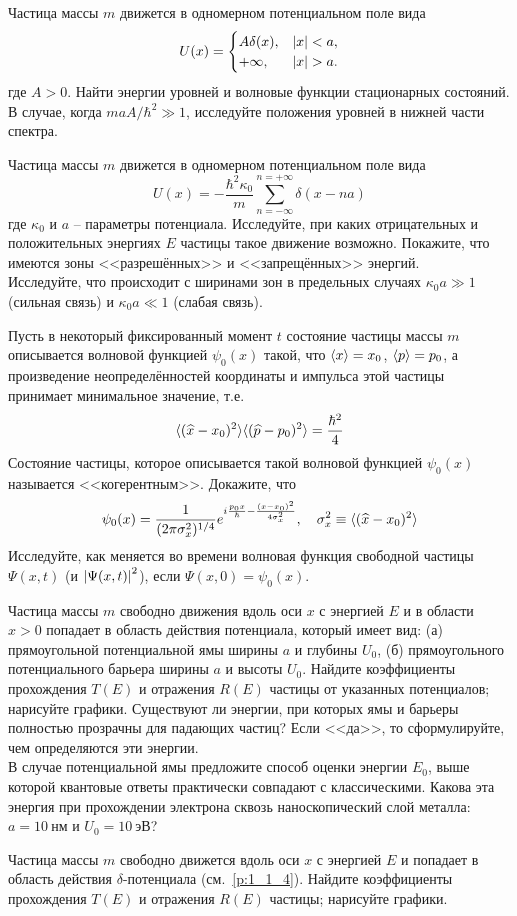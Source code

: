 \begin{problem}
%
\item\label{p:1_1_9}%
Частица массы $m$ движется в одномерном потенциальном поле вида
$$
U(x) =
\begin{cases}
A\delta(x), & \left\lvert{x}\right\rvert < a,\\
+\infty, & \left\lvert{x}\right\rvert > a.
\end{cases}
$$%
где $A > 0$. Найти энергии уровней и волновые функции стационарных состояний. В случае, когда $maA/\hbar^2 \gg 1$, исследуйте положения уровней в нижней части спектра.
%
\item\label{p:1_1_10}%
Частица массы $m$ движется в одномерном потенциальном поле вида
$$
U(x) = -\frac{\hbar^2 \kappa_0}{m} \sum_{n=-\infty}^{n=+\infty} \delta(x - na)
$$%
%
где $\kappa_0$ и $a$ -- параметры потенциала. Исследуйте, при каких отрицательных и положительных энергиях $E$ частицы такое движение возможно. Покажите, что имеются зоны <<разрешённых>> и <<запрещённых>> энергий.\\
Исследуйте, что происходит с ширинами зон в предельных случаях $\kappa_0 a \gg 1$ (сильная связь) и $\kappa_0 a \ll 1$ (слабая связь).
%
\item\label{p:1_1_11}%
Пусть в некоторый фиксированный момент $t$ состояние частицы массы $m$ описывается волновой функцией $\psi_0(x)$ такой, что $\langle{x}\rangle = x_0$, $\langle{p}\rangle = p_0$, а произведение неопределённостей координаты и импульса этой частицы принимает минимальное значение, т.е.
$$
\langle{(\widehat{x} - x_0)^2}\rangle \langle{(\widehat{p} - p_0)^2}\rangle = \frac{\hbar^2}{4}
$$%
%
Состояние частицы, которое описывается такой волновой функцией $\psi_0(x)$ называется <<когерентным>>. Докажите, что
$$
\psi_0(x) =
  \frac{1}{(2\pi\sigma^{2}_{x})^{1/4}}
  e^{i\frac{p_0 x}{\hbar} - \frac{(x - x_0)^2}{4\sigma^{2}_{x}}}, ~~~
  \sigma^2_x \equiv \langle{(\widehat{x} - x_0)^2}\rangle
$$%
%
Исследуйте, как меняется во времени волновая функция свободной частицы $\Psi(x, t)$ (и $\left\lvert{\Psi(x, t)}\right\rvert^2$), если $\Psi(x, 0) = \psi_0(x)$.
%
\item\label{p:1_1_12}%
Частица массы $m$ свободно движения вдоль оси $x$ с энергией $E$ и в области $x > 0$ попадает в область действия потенциала, который имеет вид: (а) прямоугольной потенциальной ямы ширины $a$ и глубины $U_0$, (б) прямоугольного потенциального барьера ширины $a$ и высоты $U_0$. Найдите коэффициенты прохождения $T(E)$ и отражения $R(E)$ частицы от указанных потенциалов; нарисуйте графики. Существуют ли энергии, при которых ямы и барьеры полностью прозрачны для падающих частиц? Если <<да>>, то сформулируйте, чем определяются эти энергии.\\
В случае потенциальной ямы предложите способ оценки энергии $E_0$, выше которой квантовые ответы практически совпадают с классическими. Какова эта энергия при прохождении электрона сквозь наноскопический слой металла: $a = 10~\text{нм}$ и $U_0 = 10~\text{эВ}$?
%
\item\label{p:1_1_13}%
Частица массы $m$ свободно движется вдоль оси $x$ с энергией $E$ и попадает в область действия $\delta$-потенциала (см.~\cref{p:1_1_4}). Найдите коэффициенты прохождения $T(E)$ и отражения $R(E)$ частицы; нарисуйте графики.
\end{problem}


